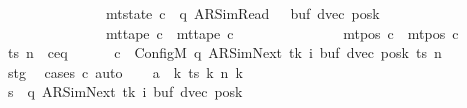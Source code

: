 \begin{isabellebody}
\ \ \ \ \ \ \ \ \ \ \ \ \ \ {\isasymand}\ mt{\isacharunderscore}{\kern0pt}state\ c{\isacharprime}{\kern0pt}{\isacharprime}{\kern0pt}\ {\isacharequal}{\kern0pt}\ {\isacharparenleft}{\kern0pt}q{\isacharcomma}{\kern0pt}\ AR{\isacharunderscore}{\kern0pt}SimRead{\isacharcomma}{\kern0pt}\ {}{\isacharcomma}{\kern0pt}\ {}{\isacharcomma}{\kern0pt}\ buf{\isacharcomma}{\kern0pt}\ dvec{\isacharcomma}{\kern0pt}\ posk{\isacharparenright}{\kern0pt}\isanewline
\ \ \ \ \ \ \ \ \ \ \ \ \ \ {\isasymand}\ mt{\isacharunderscore}{\kern0pt}tape\ c{\isacharprime}{\kern0pt}{\isacharprime}{\kern0pt}\ {\isacharequal}{\kern0pt}\ mt{\isacharunderscore}{\kern0pt}tape\ c{\isacharprime}{\kern0pt}\isanewline
\ \ \ \ \ \ \ \ \ \ \ \ \ \ {\isasymand}\ mt{\isacharunderscore}{\kern0pt}pos\ c{\isacharprime}{\kern0pt}{\isacharprime}{\kern0pt}\ {\isacharequal}{\kern0pt}\ mt{\isacharunderscore}{\kern0pt}pos\ c{\isacharprime}{\kern0pt}{\isachardoublequoteclose}\isanewline
%
\isadelimproof
%
\endisadelimproof
%
\isatagproof
{}\isamarkupfalse%
\ {\isacharminus}{\kern0pt}\isanewline
\ \ \isamarkupfalse%
\ ts\ n\ \ c{\isacharprime}{\kern0pt}{\isacharunderscore}{\kern0pt}eq{\isacharcolon}{\kern0pt}\isanewline
\ \ \ \ \ \ {\isachardoublequoteopen}c{\isacharprime}{\kern0pt}\ {\isacharequal}{\kern0pt}\ Config\isactrlsub M\ {\isacharparenleft}{\kern0pt}q{\isacharcomma}{\kern0pt}\ AR{\isacharunderscore}{\kern0pt}SimNext{\isacharcomma}{\kern0pt}\ tk{\isacharcomma}{\kern0pt}\ i{\isacharcomma}{\kern0pt}\ buf{\isacharcomma}{\kern0pt}\ dvec{\isacharcomma}{\kern0pt}\ posk{\isacharparenright}{\kern0pt}\ ts\ n{\isachardoublequoteclose}\isanewline
\ \ \ \ \isamarkupfalse%
\ stg\ \isamarkupfalse%
\ {\isacharparenleft}{\kern0pt}cases\ c{\isacharprime}{\kern0pt}{\isacharparenright}{\kern0pt}\ auto\isanewline
\ \ \isamarkupfalse%
\ {\isacharquery}{\kern0pt}a\ {\isacharequal}{\kern0pt}\ {\isachardoublequoteopen}{\isasymlambda}k{\isachardot}{\kern0pt}\ ts\ k\ {\isacharparenleft}{\kern0pt}n\ k{\isacharparenright}{\kern0pt}{\isachardoublequoteclose}\isanewline
\ \ \isamarkupfalse%
\ {\isacharquery}{\kern0pt}s\ {\isacharequal}{\kern0pt}\ {\isachardoublequoteopen}{\isacharparenleft}{\kern0pt}q{\isacharcomma}{\kern0pt}\ AR{\isacharunderscore}{\kern0pt}SimNext{\isacharcomma}{\kern0pt}\ tk{\isacharcomma}{\kern0pt}\ i{\isacharcomma}{\kern0pt}\ buf{\isacharcomma}{\kern0pt}\ dvec{\isacharcomma}{\kern0pt}\ posk{\isacharparenright}{\kern0pt}{\isachardoublequoteclose}\isanewline

\end{isabellebody}
